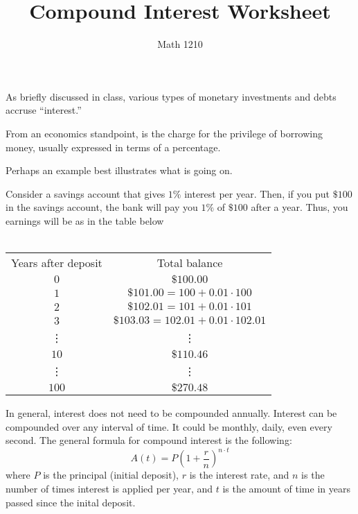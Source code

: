 \documentclass[12pt]{article}
\author{Math 1210}
\title{Compound Interest Worksheet}
\theoremstyle{mainstyle} %
\theoremstyle{longstyle}
\begin{document}
\maketitle
As briefly discussed in class, various types of monetary investments
and debts accruse ``interest.''
\begin{defn}
  From an economics standpoint, 
is the charge for the privilege of borrowing money, usually expressed
in terms of a percentage.
\end{defn}
Perhaps an example best illustrates what is going on.
\begin{example}
  Consider a savings account that gives \(1\%\) interest per
  year. Then, if you put \(\$100\) in the savings account, the bank
  will pay you \(1\%\) of \(\$100\) after a year. Thus, you earnings
  will be as in the table below \\ \\
  \begin{tabular}{|c|c|}
    Years after deposit&Total balance \\
    \(0\) & \(\$100.00\) \\
    \(1\) & \(\$101.00 = 100 + 0.01 \cdot 100\) \\
    \(2\) & \(\$102.01 = 101 + 0.01 \cdot 101\) \\
    \(3\) & \(\$103.03 = 102.01 + 0.01 \cdot 102.01\) \\
    \vdots & \vdots \\
    \(10\) & \(\$110.46\) \\
    \vdots & \vdots \\
    \(100\) & \(\$270.48\)
  \end{tabular}
\end{example}
In general, interest does not need to be compounded annually. Interest
can be compounded over any interval of time. It could be monthly,
daily, even every second. The general formula for compound interest is
the following: \[
  A(t) = P \left( 1+\frac{r}{n} \right)^{n\cdot t}
\]
where \(P\) is the principal (initial deposit), \(r\) is the interest
rate, and \(n\) is the number of times interest is applied per year,
and \(t\) is the amount of time in years passed since the inital
deposit. \\
\end{document}
